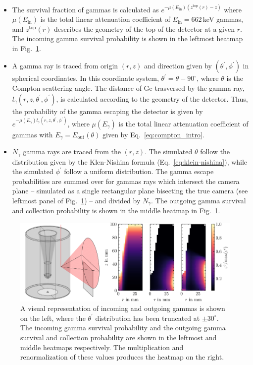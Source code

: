 \begin{itemize}
	\item The survival fraction of gammas is calculated as $e^{-\mu(E_\text{in})(z^\text{top}(r) - z)}$ where $\mu(E_\text{in})$ is the total linear attenuation coefficient of $E_\text{in}=662$\,keV gammas, and $z^\text{top}(r)$ describes the geometry of the top of the detector at a given $r$. The incoming gamma survival probability is shown in the leftmost heatmap in Fig.~\ref{fig:acceptance_corr}. 
	\item A gamma ray is traced from origin $(r,z)$ and direction given by $(\theta^\prime, \phi^\prime)$ in spherical coordinates. In this coordinate system, $\theta^\prime = \theta - 90^\circ$, where $\theta$ is the Compton scattering angle.  The distance of Ge trasversed by the gamma ray, $l_\gamma(r,z,\theta^\prime, \phi^\prime)$, is calculated according to the geometry of the detector. Thus, the probability of the gamma escaping the detector is given by $e^{-\mu(E_\gamma)l_\gamma(r,z,\theta^\prime,\phi^\prime)}$, where $\mu(E_\gamma)$ is the total linear attenuation coefficient of gammas with $E_\gamma = E_\text{out}(\theta)$ given by Eq.~\ref{eq:compton_intro}.
	\item $N_\gamma$ gamma rays are traced from the $(r,z)$. The simulated $\theta$ follow the distribution given by the Klen-Nishina formula (Eq.~\ref{eq:klein-nishina}), while the simulated $\phi^\prime$ follow a uniform distribution. The gamma escape probabilities are summed over for gammas rays which intersect the camera plane -- simulated as a single rectangular plane bisecting the true camera (see leftmost panel of Fig.~\ref{fig:acceptance_corr}) -- and divided by $N_\gamma$. The outgoing gamma survival and collection probability is shown in the middle heatmap in Fig.~\ref{fig:acceptance_corr}. 
\end{itemize}
\begin{figure}[htb]
    \centering
    \includegraphics[width=6in]{figs/trapping/accemptance_corr.png}
    \caption{A visual representation of incoming and outgoing gammas is shown on the left, where the $\theta^\prime$ distribution has been truncated at $\pm30^\circ$. The incoming gamma survival probability and the outgoing gamma survival and collection probability are shown in the leftmost and middle heatmaps respectively. The multiplication and renormalization of these values produces the heatmap on the right.}
	\label{fig:acceptance_corr}
\end{figure}
